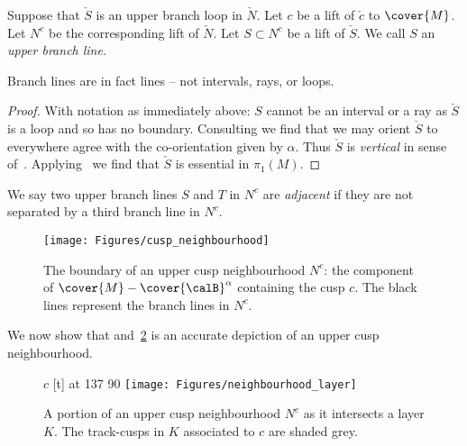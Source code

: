 \documentclass[12pt]{amsart}
\begin{document}
Suppose that $\check{S}$ is an upper branch loop in $\check{N}$.  Let $c$ be a lift of $\check{c}$ to $\cover{M}$. Let $N^c$ be the corresponding lift of $\check{N}$.  Let $S \subset N^c$ be a lift of $\check{S}$.  We call $S$ an \emph{upper branch line}.  

\begin{lemma}
\label{Lem:BranchLinesAreLines}
Branch lines are in fact lines -- not intervals, rays, or loops.  
\end{lemma}

\begin{proof}
With notation as immediately above: $S$ cannot be an interval or a ray as $\check{S}$ is a loop and so has no boundary.  Consulting 
 we find that we may orient $\check{S}$ to everywhere agree with the co-orientation given by $\alpha$.  Thus $\check{S}$ is \emph{vertical} in sense of~\cite[Definition~2.2]{SchleimerSegerman19}.  Applying~\cite[Theorem~3.2]{SchleimerSegerman19} we find that $\check{S}$ is essential in $\pi_1(M)$.  
\end{proof}

\begin{definition}
\label{Def:Adjacent}
We say two upper branch lines $S$ and $T$ in $N^c$ are \emph{adjacent} if they are not separated by a third branch line in $N^c$.  
\end{definition}

\begin{figure}[htb]
\centering
\texttt{[image: Figures/cusp\_neighbourhood]}
\caption{The boundary of an upper cusp neighbourhood $N^c$: the component of $\cover{M} - \cover{\calB}^\alpha$ containing the cusp $c$.  The black lines represent the branch lines in $N^c$.}
\label{Fig:CuspNeighbourhood}
\end{figure}

We now show that  and~\ref{Fig:NeighbourhoodLayer} is an accurate depiction of an upper cusp neighbourhood. 


\begin{figure}[htb]
\centering
{}
\small\hair 2pt
\pinlabel $c$ [t] at 137 90
\endlabellist
\texttt{[image: Figures/neighbourhood\_layer]}
\caption{A portion of an upper cusp neighbourhood $N^c$ as it intersects a layer $K$.  The track-cusps in $K$ associated to $c$ are shaded grey.}
\label{Fig:NeighbourhoodLayer}
\end{figure}
\end{document}
